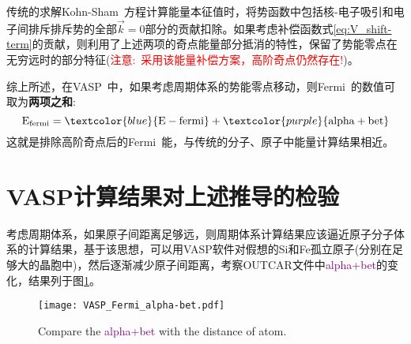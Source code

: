 传统的求解\textrm{Kohn-Sham~}方程计算能量本征值时，将势函数中包括核-电子吸引和电子间排斥排斥势的全部$\vec k=0$部分的贡献扣除。如果考虑补偿函数式\eqref{eq:V_shift-term}的贡献，则利用了上述两项的奇点能量部分抵消的特性，保留了势能零点在无穷远时的部分特征(\textcolor{red}{注意:~采用该能量补偿方案，高阶奇点仍然存在!})。

综上所述，在\textrm{VASP~}中，如果考虑周期体系的势能零点移动，则\textrm{Fermi~}的数值可取为\textbf{两项之和}:~
\begin{displaymath}
	\mathrm{E_{fermi}}=\textcolor{blue}{\mathrm{E-fermi}}+\textcolor{purple}{\mathrm{alpha+bet}}
\end{displaymath}
这就是排除高阶奇点后的\textrm{Fermi~}能，与传统的分子、原子中能量计算结果相近。

\section{\rm{VASP}计算结果对上述推导的检验}
考虑周期体系，如果原子间距离足够远，则周期体系计算结果应该逼近原子分子体系的计算结果，基于该思想，可以用\textrm{VASP}软件对假想的\textrm{Si}和\textrm{Fe}孤立原子(分别在足够大的晶胞中)，然后逐渐减少原子间距离，考察\textrm{OUTCAR}文件中\textcolor{purple}{\textrm{alpha+bet}}的变化，结果列于图\ref{Fig:VASP_alpha+bet}。
\begin{figure}[h!]
\centering
\hspace*{-0.7in}
\vspace*{-0.2in}
\texttt{[image: VASP\_Fermi\_alpha-bet.pdf]}
\caption{\small Compare the \textcolor{purple}{\textrm{alpha+bet}} with the distance of atom.}%
\label{Fig:VASP_alpha+bet}
\end{figure}

